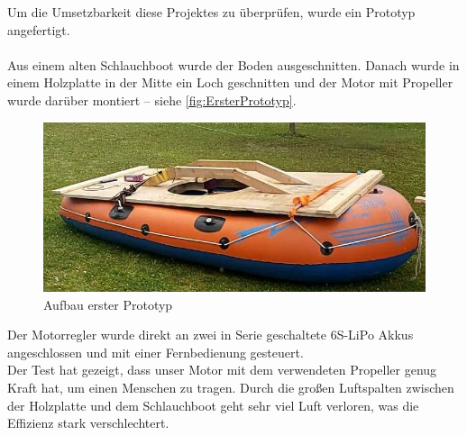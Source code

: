 Um die Umsetzbarkeit diese Projektes zu überprüfen, wurde ein Prototyp angefertigt.\\
\\
Aus einem alten Schlauchboot wurde der Boden ausgeschnitten. Danach wurde in einem Holzplatte in der Mitte ein Loch geschnitten und der Motor mit Propeller wurde darüber montiert -- siehe \autoref{fig:ErsterPrototyp}.
\begin{figure}[h!]
  \centering
  \includegraphics[width=.95\textwidth]{./Aufbau1.jpg}
  \caption{Aufbau erster Prototyp}
  \label{fig:ErsterPrototyp}
\end{figure}

Der Motorregler wurde direkt an zwei in Serie geschaltete 6S-LiPo Akkus angeschlossen und mit einer Fernbedienung gesteuert.\\
Der Test hat gezeigt, dass unser Motor mit dem verwendeten Propeller genug Kraft hat, um einen Menschen zu tragen. Durch die großen Luftspalten zwischen der Holzplatte und dem Schlauchboot geht sehr viel Luft verloren, was die Effizienz stark verschlechtert.

